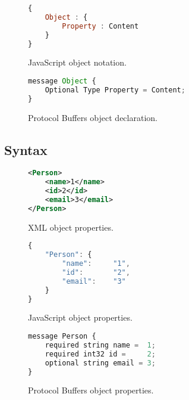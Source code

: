 \documentclass[../report.tex]{subfiles}
\begin{document}
\vspace{1mm}

\begin{figure}[H]
\begin{lstlisting}[language=JavaScript, numbers=none]
{
    Object : {
        Property : Content
    }
}
\end{lstlisting}
\caption{JavaScript object notation.}
\end{figure}

\vspace{1mm}

\begin{figure}[H]
\begin{lstlisting}[language=JavaScript, numbers=none]
message Object {
    Optional Type Property = Content;
}
\end{lstlisting}
\caption{Protocol Buffers object declaration.}
\end{figure}

\subsection{Syntax}

\begin{figure}[H]
\begin{lstlisting}[language=XML, numbers=none]
<Person>
    <name>1</name>
    <id>2</id>
    <email>3</email>
</Person>
\end{lstlisting}
\caption{XML object properties.}
\end{figure}

\vspace{1mm}

\begin{figure}[H]
\begin{lstlisting}[language=JavaScript, numbers=none]
{
    "Person": {
        "name":     "1",
        "id":       "2",
        "email":    "3"
    }
}
\end{lstlisting}
\caption{JavaScript object properties.}
\end{figure}

\vspace{1mm}

\begin{figure}[H]
\begin{lstlisting}[language=JavaScript, numbers=none]
message Person {
    required string name =  1;
    required int32 id =     2;
    optional string email = 3;
}
\end{lstlisting}
\caption{Protocol Buffers object properties.}
\end{figure}
\end{document}
